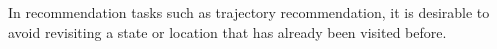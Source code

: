 
In recommendation tasks such as trajectory recommendation, it is desirable to avoid revisiting
a state or location that has already been visited before.
